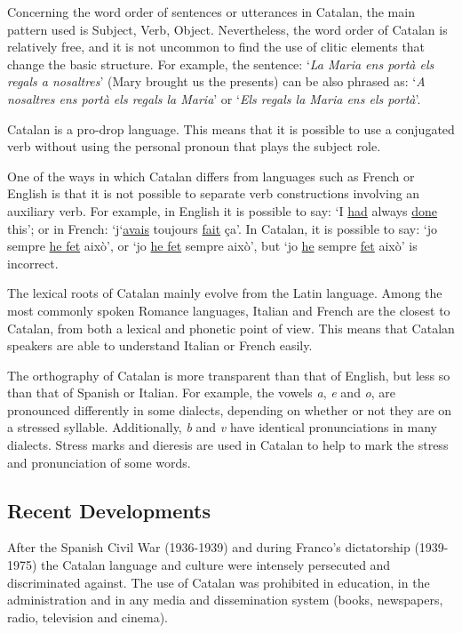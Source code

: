 \documentclass[]{../../metanetpaper}
\begin{document}
\begin{multicols}{2}
Concerning the word order of sentences or utterances in Catalan, the main pattern used is Subject, Verb, Object. Nevertheless, the word order of Catalan is relatively free, and it is not uncommon to find the use of clitic elements that change the basic structure. For example, the sentence: ‘\textit{La Maria ens portà els regals a nosaltres}’ (Mary brought us the presents) can be also phrased as: ‘\textit{A nosaltres ens portà els regals la Maria}’ or ‘\textit{Els regals la Maria ens els portà}’.

Catalan is a pro-drop language. This means that it is possible to use a conjugated verb without using the personal pronoun that plays the subject role.

One of the ways in which Catalan differs from languages such as  French or English is that it is not possible to separate verb constructions involving an auxiliary verb. For example, in English it is possible to say: ‘I \underline{had} always \underline{done} this’; or in French: ‘j‘\underline{avais} toujours \underline{fait} ça’. In Catalan, it is possible to say: ‘jo sempre \underline{he fet} això’, or ‘jo \underline{he fet} sempre això’, but ‘jo \underline{he} sempre \underline{fet} això’ is incorrect.

The lexical roots of Catalan mainly evolve from the Latin language. Among the most commonly spoken Romance languages, Italian and French are the closest to Catalan, from both a lexical and phonetic point of view. This means that Catalan speakers are able to understand Italian or French easily.

The orthography of Catalan is more transparent than that of English, but less so than that of Spanish or Italian. For example, the vowels \textit{a}, \textit{e} and \textit{o}, are pronounced differently in some dialects, depending on whether or not they are on a stressed syllable. Additionally, \textit{b} and \textit{v} have identical pronunciations in many dialects. Stress marks and dieresis are used in Catalan to help to mark the stress and pronunciation of some words.

\subsection{Recent Developments}

After the Spanish Civil War (1936-1939) and during Franco’s dictatorship (1939-1975) the Catalan language and culture were intensely persecuted and discriminated against. The use of Catalan was prohibited in education, in the administration and in any media and dissemination system (books, newspapers, radio, television and cinema).


\end{multicols}
\end{document}

